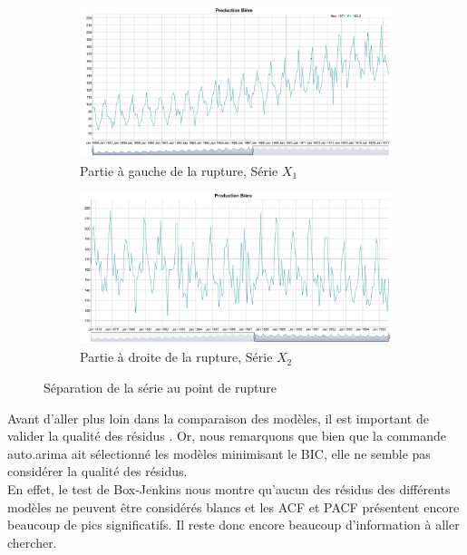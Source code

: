 \documentclass[12pt,a4paper]{book}
\newcommand{\1}{\mathds{1}}
\begin{document}
\vspace{5 mm}
\begin{figure}[h]
	\begin{subfigure}{.5\textwidth}
  		\centering
    	\includegraphics[width=\textwidth]{rupture1}  
    	\caption{Partie à gauche de la rupture, Série $X_1$}
    	\label{fig:sub1}
    \end{subfigure}
    \begin{subfigure}{.5\textwidth}
    	\centering
    	\includegraphics[width=\textwidth]{rupture2}  
    	\caption{Partie à droite de la rupture, Série $X_2$}
    	\label{fig:sub2}
    \end{subfigure}

\caption{Séparation de la série au point de rupture}
\label{fig:3}
\end{figure}

\vspace{15 mm}
Avant d'aller plus loin dans la comparaison des modèles, il est important de valider la qualité des résidus . Or, nous remarquons que bien que la commande auto.arima ait sélectionné les modèles minimisant le BIC, elle ne semble pas considérer la qualité des résidus. \\
En effet, le test de Box-Jenkins nous montre qu'aucun des résidus des différents modèles ne peuvent être considérés blancs et les ACF et PACF présentent encore beaucoup de pics significatifs. Il reste donc encore beaucoup d'information à aller chercher. \\
\end{document}

